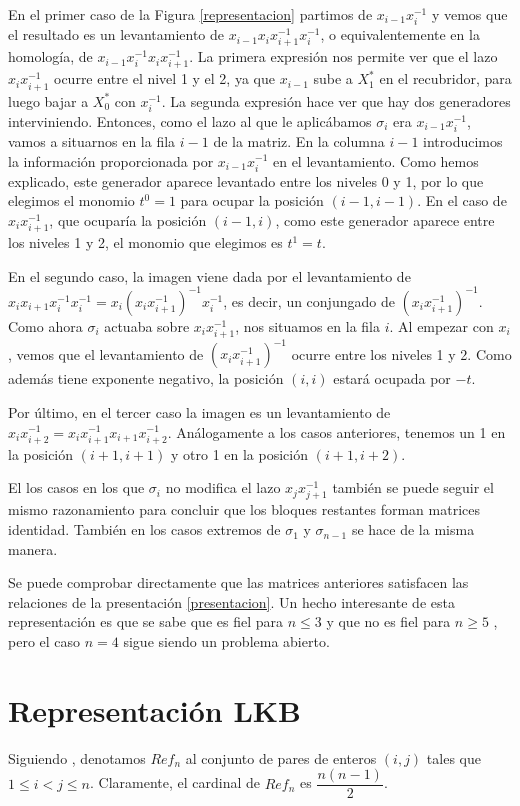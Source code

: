 \documentclass[TFG.tex]{subfiles}
\begin{document}
En el primer caso de la Figura \ref{representacion} partimos de $x_{i-1}x_i^{-1}$ y vemos que el resultado es un levantamiento de $x_{i-1}x_ix_{i+1}^{-1}x_i^{-1}$, o equivalentemente en la homología, de $x_{i-1}x_i^{-1}x_ix_{i+1}^{-1}$. La primera expresión nos permite ver que el lazo $x_ix_{i+1}^{-1}$ ocurre entre el nivel 1 y el 2, ya que $x_{i-1}$ sube a $X^*_1$ en el recubridor, para luego bajar a $X^*_0$ con $x_i^{-1}$. La segunda expresión hace ver que hay dos generadores interviniendo. Entonces, como el lazo al que le aplicábamos $\sigma_i$ era $x_{i-1}x_i^{-1}$, vamos a situarnos en la fila $i-1$ de la matriz. En la columna $i-1$ introducimos la información proporcionada por $x_{i-1}x_i^{-1}$ en el levantamiento. Como hemos explicado, este generador aparece levantado entre los niveles 0 y 1, por lo que elegimos el monomio $t^0=1$ para ocupar la posición $(i-1,i-1)$. En el caso de $x_ix_{i+1}^{-1}$, que ocuparía la posición $(i-1,i)$, como este generador aparece entre los niveles 1 y 2, el monomio que elegimos es $t^1=t$. 

En el segundo caso, la imagen viene dada por el levantamiento de $x_ix_{i+1}x_i^{-1}x_i^{-1}=x_i(x_ix_{i+1}^{-1})^{-1}x_i^{-1}$, es decir, un conjungado de $(x_ix_{i+1}^{-1})^{-1}$. Como ahora $\sigma_i$ actuaba sobre $x_ix_{i+1}^{-1}$, nos situamos en la fila $i$. Al empezar con $x_i$, vemos que el levantamiento de $(x_ix_{i+1}^{-1})^{-1}$ ocurre entre los niveles 1 y 2. Como además tiene exponente negativo, la posición $(i,i)$ estará ocupada por $-t$. 

Por último, en el tercer caso la imagen es un levantamiento de $x_ix_{i+2}^{-1}=x_ix_{i+1}^{-1}x_{i+1}x_{i+2}^{-1}$. Análogamente a los casos anteriores, tenemos un 1 en la posición $(i+1,i+1)$ y otro 1 en la posición $(i+1,i+2)$. 

El los casos en los que $\sigma_i$ no modifica el lazo $x_jx_{j+1}^{-1}$ también se puede seguir el mismo razonamiento para concluir que los bloques restantes forman matrices identidad. También en los casos extremos de $\sigma_1$ y $\sigma_{n-1}$ se hace de la misma manera.

Se puede comprobar directamente que las matrices anteriores satisfacen las relaciones de la presentación \ref{presentacion}. Un hecho interesante de esta representación es que se sabe que es fiel para $n\leq 3$ \cite{Birman} y que no es fiel para $n\geq 5$ \cite{Bil}\cite{LP}, pero el caso $n=4$ sigue siendo un problema abierto.

\section{Representación LKB}
Siguiendo \cite{Krammer}, denotamos $Ref_n$ al conjunto de pares de enteros $(i,j)$ tales que $1\leq i<j\leq n$. Claramente, el cardinal de $Ref_n$ es $\dfrac{n(n-1)}{2}$.
\end{document}
